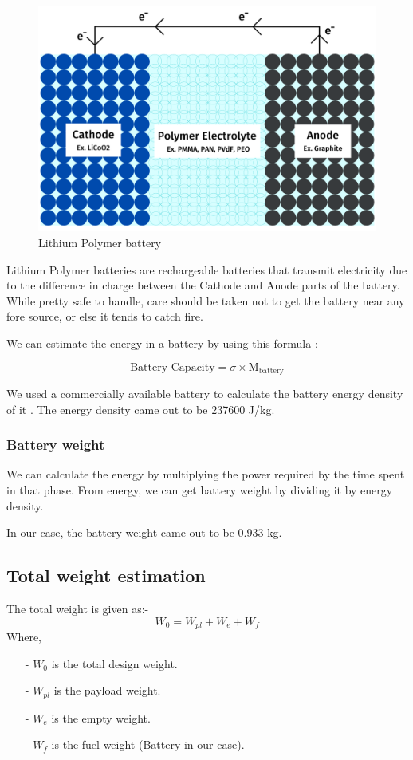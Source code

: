 \documentclass[12 pt]{article}
\begin{document}
\begin{figure}[h]
    \centering
    \includegraphics[width=0.5\linewidth]{Extra pics/LiPo_battery_diagram.png}
    \caption{Lithium Polymer battery}
    \label{Lithium Polymer battery}
\end{figure}

Lithium Polymer batteries are rechargeable batteries that transmit electricity due to the difference in charge between the Cathode and Anode parts of the battery. While pretty safe to handle, care should be taken not to get the battery near any fore source, or else it tends to catch fire.

We can estimate the energy in a battery by using this formula \cite{Lipobattery}:-

$$ \text{Battery Capacity} = \sigma \times \text{M}_\text{battery} $$

We used a commercially available battery to calculate the battery energy density of it \cite{Batteryref}. The energy density came out to be 237600 J/kg.

\subsubsection{Battery weight}

We can calculate the energy by multiplying the power required by the time spent in that phase. From energy, we can get battery weight by dividing it by energy density. 

In our case, the battery weight came out to be 0.933 kg.


\subsection{Total weight estimation}

The total weight is given as:- 
$$ W_0 = W_{pl} + W_{e} + W_{f} $$
Where,
\begin{itemize}
    \item[-] $W_0$ is the total design weight.
    \item [-] $W_{pl}$ is the payload weight.
    \item [-] $W_{e}$ is the empty weight.
    \item [-] $W_{f}$ is the fuel weight (Battery in our case).
\end{itemize}
\end{document}

